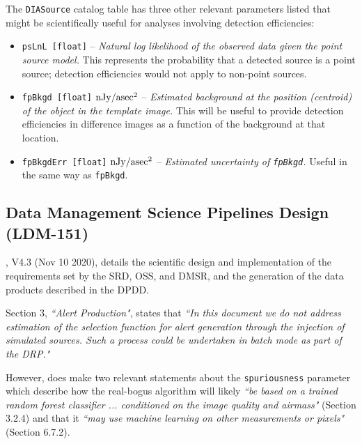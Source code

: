 The {\tt DIASource} catalog table has three other relevant parameters listed that might be scientifically useful for analyses involving detection efficiencies:
\begin{itemize}
\item {\tt psLnL [float]} -- {\it Natural log likelihood of the observed data given the point source model.} This represents the probability that a detected source is a point source; detection efficiencies would not apply to non-point sources.
\item {\tt fpBkgd [float]} $\rm nJy/asec^2$ -- {\it Estimated background at the position (centroid) of the object in the template image.} This will be useful to provide detection efficiencies in difference images as a function of the background at that location.
\item {\tt fpBkgdErr [float]} $\rm nJy/asec^2$ -- {\it Estimated uncertainty of {\tt fpBkgd}.} Useful in the same way as {\tt fpBkgd}. 
\end{itemize}


\subsection{Data Management Science Pipelines Design (LDM-151)}\label{ssec:docs_ldm151}

, V4.3 (Nov 10 2020), details the scientific design and implementation of the requirements set by the SRD, OSS, and DMSR, and the generation of the data products described in the DPDD.

Section 3, {\it ``Alert Production"}, states that {\it ``In this document we do not address estimation of the selection function for alert generation through the injection of simulated sources. Such a process could be undertaken in batch mode as part of the DRP."}

However,  does make two relevant statements about the {\tt spuriousness} parameter which describe how the real-bogus algorithm will likely {\it ``be based on a trained random forest classifier ... conditioned on the image quality and airmass"} (Section 3.2.4) and that it  {\it ``may use machine learning on other measurements or pixels"} (Section 6.7.2).



